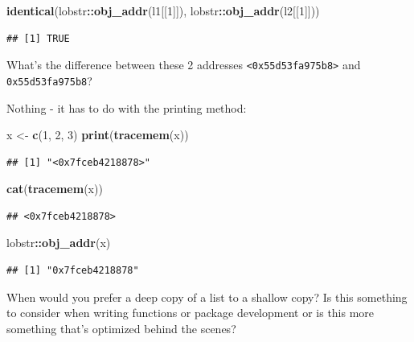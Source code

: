 \documentclass[]{book}
\newenvironment{Shaded}{\begin{snugshade}}{\end{snugshade}}
\newcommand{\DecValTok}[1]{\textcolor[rgb]{0.00,0.00,0.81}{#1}}
\newcommand{\KeywordTok}[1]{\textcolor[rgb]{0.13,0.29,0.53}{\textbf{#1}}}
\newcommand{\NormalTok}[1]{#1}
\newcommand{\OperatorTok}[1]{\textcolor[rgb]{0.81,0.36,0.00}{\textbf{#1}}}
\newcommand{\StringTok}[1]{\textcolor[rgb]{0.31,0.60,0.02}{#1}}
\begin{document}
\begin{Shaded}
\begin{Highlighting}[]
\KeywordTok{identical}\NormalTok{(lobstr}\OperatorTok{::}\KeywordTok{obj_addr}\NormalTok{(l1[[}\DecValTok{1}\NormalTok{]]), lobstr}\OperatorTok{::}\KeywordTok{obj_addr}\NormalTok{(l2[[}\DecValTok{1}\NormalTok{]]))}
\end{Highlighting}
\end{Shaded}

\begin{verbatim}
## [1] TRUE
\end{verbatim}

What's the difference between these 2 addresses \texttt{\textless{}0x55d53fa975b8\textgreater{}} and \texttt{0x55d53fa975b8}?

Nothing - it has to do with the printing method:

\begin{Shaded}
\begin{Highlighting}[]
\NormalTok{x <-}\StringTok{ }\KeywordTok{c}\NormalTok{(}\DecValTok{1}\NormalTok{, }\DecValTok{2}\NormalTok{, }\DecValTok{3}\NormalTok{)}
\KeywordTok{print}\NormalTok{(}\KeywordTok{tracemem}\NormalTok{(x))}
\end{Highlighting}
\end{Shaded}

\begin{verbatim}
## [1] "<0x7fceb4218878>"
\end{verbatim}

\begin{Shaded}
\begin{Highlighting}[]
\KeywordTok{cat}\NormalTok{(}\KeywordTok{tracemem}\NormalTok{(x))}
\end{Highlighting}
\end{Shaded}

\begin{verbatim}
## <0x7fceb4218878>
\end{verbatim}

\begin{Shaded}
\begin{Highlighting}[]
\NormalTok{lobstr}\OperatorTok{::}\KeywordTok{obj_addr}\NormalTok{(x)}
\end{Highlighting}
\end{Shaded}

\begin{verbatim}
## [1] "0x7fceb4218878"
\end{verbatim}

When would you prefer a deep copy of a list to a shallow copy? Is this something to consider when writing functions or package development or is this more something that's optimized behind the scenes?
\end{document}
